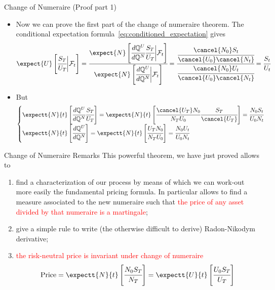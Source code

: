 \documentclass{beamer}
\begin{document}
\begin{frame}{Change of Numeraire (Proof part 1)}
	\begin{itemize}
		\item Now we can prove the first part of the change of numeraire theorem. The conditional expectation formula~\cref{eq:conditioned_expectation} gives
		\begin{equation*}
			\expect{U}\left[\cfrac{S_T}{U_T}\bigg|\mathcal{F}_t\right]=\cfrac{\expect{N}\left[\cfrac{d\mathbb{Q}^U}{d\mathbb{Q}^N}\cfrac{S_T}{U_T}\bigg|\mathcal{F}_t\right]}{\expect{N}\left[\cfrac{d\mathbb{Q}^U}{d\mathbb{Q}^N}\bigg|\mathcal{F}_t\right]} = \cfrac{\cfrac{\cancel{N_0} S_t}{\cancel{U_0} \cancel{N_t}}}{\cfrac{\cancel{N_0} U_t}{\cancel{U_0} \cancel{N_t}}} = \cfrac{S_t}{U_t}
		\end{equation*}
		\item But 
		\begin{equation*}
			\begin{cases}
				\expectt{N}{t}\left[\cfrac{d\mathbb{Q}^U}{d\mathbb{Q}^N}\cfrac{S_T}{U_T}\right]= \expectt{N}{t}\left[\cfrac{\cancel{U_T} N_0}{N_T U_0}\cfrac{S_T}{\cancel{U_T}}\right]=\cfrac{N_0 S_t}{U_0 N_t} \\
				\expectt{N}{t}\left[\cfrac{d\mathbb{Q}^U}{d\mathbb{Q}^N}\right]= \expectt{N}{t}\left[\cfrac{U_T N_0}{N_T U_0}\right] = \cfrac{N_0 U_t}{U_0 N_t}
			\end{cases}
		\end{equation*}
	\end{itemize}
\myendproof
\end{frame}	

\begin{frame}{Change of Numeraire Remarks}
  This powerful theorem, we have just proved allows to
\begin{enumerate}
    \item find a characterization of our process by means of which we can work-out more easily the fundamental pricing formula. In particular allows to find a measure associated to the new numeraire such that \textcolor{red}{the price of any asset divided by that numeraire is a martingale};
    \item give a simple rule to write (the otherwise difficult to derive) Radon-Nikodym derivative;
      \item \textcolor{red}{the risk-neutral price is invariant under change of numeraire}
    \begin{equation*}
    	\text{Price} = \expectt{N}{t}\left[\cfrac{N_0 S_T}{N_T}\right] = \expectt{U}{t}\left[\cfrac{U_0 S_T}{U_T}\right]
    \end{equation*}
    \end{enumerate}
\end{frame}
\end{document}
